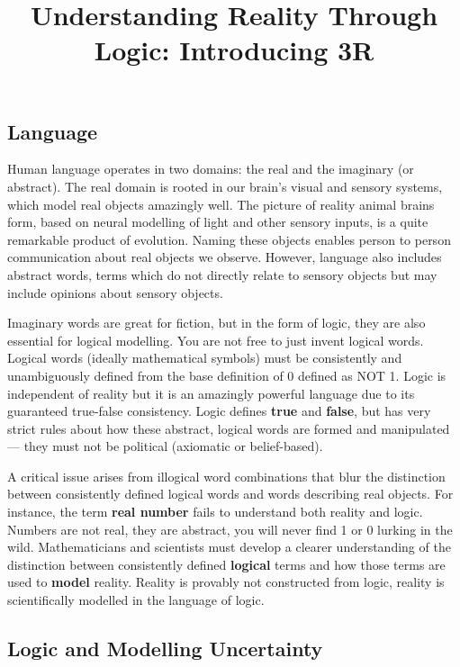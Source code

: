 \documentclass{article}
\title{Understanding Reality Through Logic: Introducing 3R}
\date{}
\begin{document}
\maketitle

\subsection*{Language}

Human language operates in two domains: the real and the imaginary (or abstract). The real domain is rooted in our brain's visual and sensory systems, which model real objects amazingly well. The picture of reality animal brains form, based on neural modelling of light and other sensory inputs, is a quite remarkable product of evolution. Naming these objects enables person to person communication about real objects we observe. However, language also includes abstract words, terms which do not directly relate to sensory objects but may include opinions about sensory objects.

Imaginary words are great for fiction, but in the form of logic, they are also essential for logical modelling. You are not free to just invent logical words. Logical words (ideally mathematical symbols) must be consistently and unambiguously defined from the base definition of 0 defined as NOT 1. Logic is independent of reality but it is an amazingly powerful language due to its guaranteed true-false consistency. Logic defines \textbf{true} and \textbf{false}, but has very strict rules about how these abstract, logical words are formed and manipulated — they must not be political (axiomatic or belief-based).

A critical issue arises from illogical word combinations that blur the distinction between consistently defined logical words and words describing real objects. For instance, the term \textbf{real number} fails to understand both reality and logic. Numbers are not real, they are abstract, you will never find 1 or 0 lurking in the wild. Mathematicians and scientists must develop a clearer understanding of the distinction between consistently defined \textbf{logical} terms and how those terms are used to \textbf{model} reality. Reality is provably not constructed from logic, reality is scientifically modelled in the language of logic.

\subsection*{Logic and Modelling Uncertainty}
\end{document}
